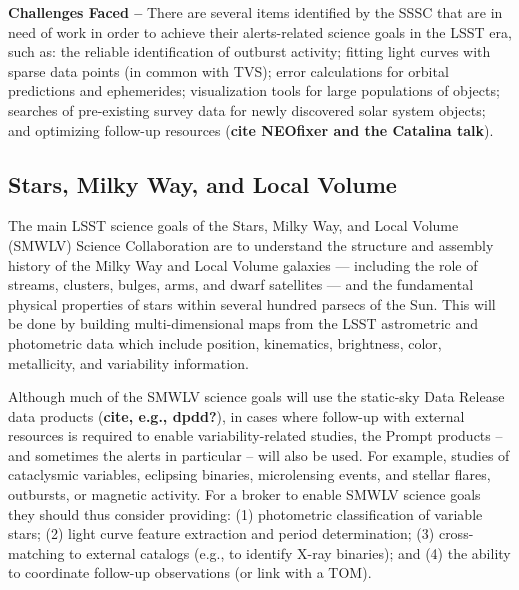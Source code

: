 {\bf Challenges Faced --} There are several items identified by the SSSC that are in need of work in order to achieve their alerts-related science goals in the LSST era, such as: 
the reliable identification of outburst activity; 
fitting light curves with sparse data points (in common with TVS); 
error calculations for orbital predictions and ephemerides; 
visualization tools for large populations of objects; 
searches of pre-existing survey data for newly discovered solar system objects; and
optimizing follow-up resources ({\bf cite NEOfixer and the Catalina talk}).


\subsection{Stars, Milky Way, and Local Volume}\label{ssec:sci_smwlv}

The main LSST science goals of the Stars, Milky Way, and Local Volume (SMWLV) Science Collaboration are to understand the structure and assembly history of the Milky Way and Local Volume galaxies --- including the role of streams, clusters, bulges, arms, and dwarf satellites --- and the fundamental physical properties of stars within several hundred parsecs of the Sun. This will be done by building multi-dimensional maps from the LSST astrometric and photometric data which include position, kinematics, brightness, color, metallicity, and variability information. 

Although much of the SMWLV science goals will use the static-sky Data Release data products ({\bf cite, e.g., dpdd?}), in cases where follow-up with external resources is required to enable variability-related studies, the Prompt products -- and sometimes the alerts in particular -- will also be used. For example, studies of cataclysmic variables, eclipsing binaries, microlensing events, and stellar flares, outbursts, or magnetic activity.
For a broker to enable SMWLV science goals they should thus consider providing: 
(1) photometric classification of variable stars;
(2) light curve feature extraction and period determination;
(3) cross-matching to external catalogs (e.g., to identify X-ray binaries); and
(4) the ability to coordinate follow-up observations (or link with a TOM). 

